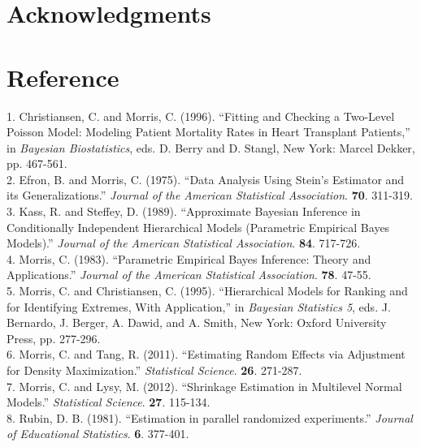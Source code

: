 \documentclass[article]{jss}
\begin{document}
\section[acknowledgments]{Acknowledgments}

\section[Reference]{Reference}
1. Christiansen, C. and Morris, C. (1996). ``Fitting and Checking a Two-Level Poisson Model: Modeling Patient Mortality Rates in Heart Transplant Patients,'' in \emph{Bayesian Biostatistics}, eds. D. Berry and D. Stangl, New York: Marcel Dekker, pp. 467-561.
\\

2. Efron, B. and Morris, C. (1975). ``Data Analysis Using Stein's Estimator and its Generalizations.'' \emph{Journal of the American Statistical Association}. \textbf{70}. 311-319.
\\

3. Kass, R. and Steffey, D. (1989). ``Approximate Bayesian Inference in Conditionally Independent Hierarchical Models (Parametric
Empirical Bayes Models).'' \emph{Journal of the American Statistical Association}. \textbf{84}. 717-726.
\\

4. Morris, C. (1983). ``Parametric Empirical Bayes Inference: Theory and Applications.'' \emph{Journal of the American Statistical Association}. \textbf{78}. 47-55.
\\

5. Morris, C. and Christiansen, C. (1995). ``Hierarchical Models for Ranking and for Identifying Extremes, With Application,'' in \emph{Bayesian Statistics 5}, eds. J. Bernardo, J. Berger, A. Dawid, and A. Smith, New York: Oxford University Press, pp. 277-296.
\\

6. Morris, C. and Tang, R. (2011). ``Estimating Random Effects via Adjustment for Density Maximization.'' \emph{Statistical Science}. \textbf{26}. 271-287.
\\

7. Morris, C. and Lysy, M. (2012). ``Shrinkage Estimation in Multilevel Normal Models.'' \emph{Statistical Science}. \textbf{27}. 115-134.
\\

8. Rubin, D. B. (1981). ``Estimation in parallel randomized
  experiments.'' \emph{Journal of Educational Statistics}. \textbf{6}. 377-401.
\\
\end{document}
